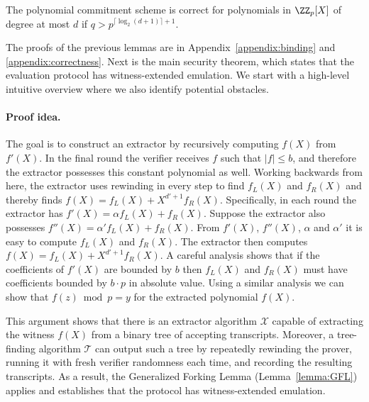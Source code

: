 \newcommand{\correctnesslemma}{
The polynomial commitment scheme is correct for polynomials in $\ZZ_p[X]$ of degree at most $d$ if $q> p^{\lceil \log_2(d+1)\rceil+1}$.
}
 
 \begin{lemma}
 	\label{lem:correctness}
\correctnesslemma
 \end{lemma}


The proofs of the previous lemmas are in Appendix~\ref{appendix:binding} and \ref{appendix:correctness}.
Next is the main security theorem, which states that the evaluation protocol has witness-extended emulation. We start with a high-level intuitive overview where we also identify potential obstacles.

\paragraph{Proof idea.} %
The goal is to construct an extractor by recursively computing $f(X)$ from $f'(X)$. In the final round the verifier receives $f$ such that $|f| \leq b$, and therefore the extractor possesses this constant polynomial as well. Working backwards from here, the extractor uses rewinding in every step to find $f_L(X)$ and $f_R(X)$ and thereby finds $f(X) = f_L(X) + X^{d'+1}f_R(X)$.
Specifically, in each round the extractor has $f'(X)=\alpha f_L(X)+ f_R(X)$. Suppose the extractor also possesses $f''(X)=\alpha' f_L(X)+ f_R(X)$. From $f'(X)$, $f''(X)$, $\alpha$ and $\alpha'$ it is easy to compute $f_L(X)$ and $f_R(X)$. The extractor then computes $f(X)=f_L(X)+X^{d'+1} f_R(X)$.
A careful analysis shows that if the coefficients of $f'(X)$ are bounded by $b$ then $f_L(X)$ and $f_R(X)$ must have coefficients bounded by $b \cdot p$ in absolute value. Using a similar analysis we can show that $f(z)\bmod p=y$ for the extracted polynomial $f(X)$.

This argument shows that there is an extractor algorithm $\mathcal{X}$ capable of extracting the witness $f(X)$ from a binary tree of accepting transcripts. Moreover, a tree-finding algorithm $\mathcal{T}$ can output such a tree by repeatedly rewinding the prover, running it with fresh verifier randomness each time, and recording the resulting transcripts. As a result, the Generalized Forking Lemma (Lemma~\ref{lemma:GFL}) applies and establishes that the protocol has witness-extended emulation.

